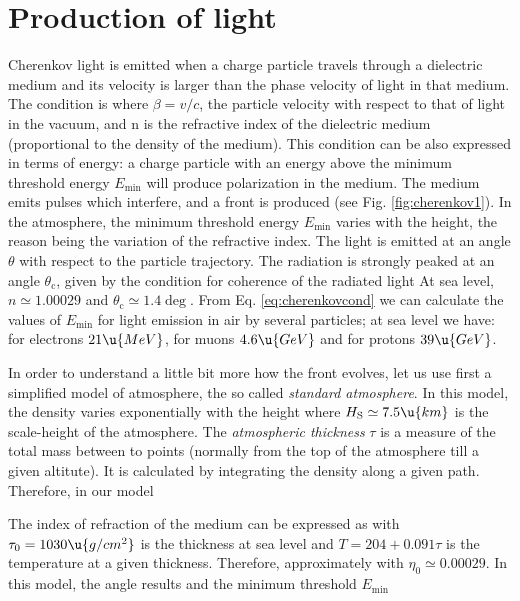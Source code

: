 \section{Production of \Cherenkov light}

Cherenkov light is emitted when a charge particle travels through a
dielectric medium and its velocity is larger than the phase velocity
of light in that medium. The condition is
%
\Cherenkovcondeq
%
where $\beta=v/c$, the particle velocity with respect to that of light
in the vacuum, and n is the refractive index of the dielectric medium
(proportional to the density of the medium). This condition can be
also expressed in terms of energy: a charge particle with an energy
above the minimum threshold energy $E_{\mathrm{min}}$ will produce
polarization in the medium. The medium emits pulses which interfere,
and a front is produced (see Fig. \ref{fig:cherenkov1}). In the
atmosphere, the minimum threshold energy $E_{\mathrm{min}}$ varies
with the height, the reason being the variation of the refractive
index. The light is emitted at an angle $\theta$ with respect to the
particle trajectory. The radiation is strongly peaked at an angle
$\theta_{\mathrm{c}}$, given by the condition for coherence of the
radiated light
%
\lightcoherenceeq
%
At sea level, $n \simeq 1.00029$ and $\theta_{\mathrm{c}} \simeq
1.4\deg$. From Eq. \eqref{eq:cherenkovcond} we can calculate the
values of $E_{\mathrm{min}}$ for \Cherenkov light emission in air by
several particles; at sea level we have: for electrons $21\u{MeV}$,
for muons $4.6\u{GeV}$ and for protons $39\u{GeV}$.

In order to understand a little bit more how the \Cherenkov front
evolves, let us use first a simplified model of atmosphere, the so
called \emph{standard atmosphere}. In this model, the density varies
exponentially with the height
%
\exprhoeq
%
where $H_{\mathrm{S}} \simeq 7.5\u{km}$ is the scale-height of the
atmosphere. The \emph{atmospheric thickness} $\tau$ is a measure of
the total mass between to points (normally from the top of the
atmosphere till a given altitute). It is calculated by integrating the
density along a given path. Therefore, in our model
%
\pathinteq

\cherenkovfig
%
The index of refraction of the medium can be expressed as 
%
%
with $\tau_0=1030\u{g/cm^2}$ is the thickness at sea level and $T=204
+ 0.091\tau$ is the temperature at a given thickness. Therefore,
approximately
%
\etaeq
%
with $\eta_0 \simeq 0.00029$. In this model, the \Cherenkov angle
results 
%
\Cherenkovangleeq
%
and the minimum threshold $E_{\mathrm{min}}$
%
\Emineq

